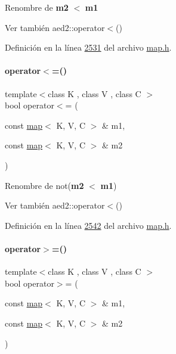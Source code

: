 Renombre de {\bfseries m2} $<$ {\bfseries m1} 

\begin{DoxySeeAlso}{Ver también}
aed2\+::operator$<$() 
\end{DoxySeeAlso}


Definición en la línea \hyperlink{map_8h_source_l02531}{2531} del archivo \hyperlink{map_8h_source}{map.\+h}.

\mbox{\label{classaed2_1_1map_afe374b37f17263d0cad3ee19a590d208_afe374b37f17263d0cad3ee19a590d208}} 
\paragraph{\texorpdfstring{operator$<$=()}{operator<=()}}
{\footnotesize\ttfamily template$<$class K , class V , class C $>$ \\
bool operator$<$= (\begin{DoxyParamCaption}\item[{const \hyperlink{classaed2_1_1map}{map}$<$ K, V, C $>$ \&}]{m1,  }\item[{const \hyperlink{classaed2_1_1map}{map}$<$ K, V, C $>$ \&}]{m2 }\end{DoxyParamCaption})\hspace{0.3cm}{\ttfamily [related]}}



Renombre de not({\bfseries m2} $<$ {\bfseries m1}) 

\begin{DoxySeeAlso}{Ver también}
aed2\+::operator$<$() 
\end{DoxySeeAlso}


Definición en la línea \hyperlink{map_8h_source_l02542}{2542} del archivo \hyperlink{map_8h_source}{map.\+h}.

\mbox{\label{classaed2_1_1map_a093a6d1a055339c5fc6297a1d47a9159_a093a6d1a055339c5fc6297a1d47a9159}} 
\paragraph{\texorpdfstring{operator$>$=()}{operator>=()}}
{\footnotesize\ttfamily template$<$class K , class V , class C $>$ \\
bool operator$>$= (\begin{DoxyParamCaption}\item[{const \hyperlink{classaed2_1_1map}{map}$<$ K, V, C $>$ \&}]{m1,  }\item[{const \hyperlink{classaed2_1_1map}{map}$<$ K, V, C $>$ \&}]{m2 }\end{DoxyParamCaption})\hspace{0.3cm}{\ttfamily [related]}}



